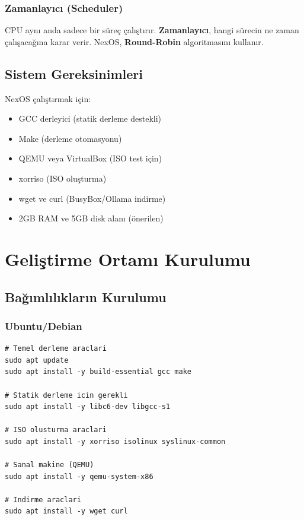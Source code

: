 \documentclass[12pt,a4paper]{report}
\begin{document}
\subsection{Zamanlayıcı (Scheduler)}

CPU aynı anda sadece bir süreç çalıştırır. \textbf{Zamanlayıcı}, hangi sürecin ne zaman çalışacağına karar verir. NexOS, \textbf{Round-Robin} algoritmasını kullanır.

\section{Sistem Gereksinimleri}

NexOS çalıştırmak için:
\begin{itemize}
    \item GCC derleyici (statik derleme destekli)
    \item Make (derleme otomasyonu)
    \item QEMU veya VirtualBox (ISO test için)
    \item xorriso (ISO oluşturma)
    \item wget ve curl (BusyBox/Ollama indirme)
    \item 2GB RAM ve 5GB disk alanı (önerilen)
\end{itemize}

\chapter{Geliştirme Ortamı Kurulumu}

\section{Bağımlılıkların Kurulumu}

\subsection{Ubuntu/Debian}

\begin{lstlisting}[style=bashstyle,caption={Gerekli Paketlerin Kurulumu}]
# Temel derleme araclari
sudo apt update
sudo apt install -y build-essential gcc make

# Statik derleme icin gerekli
sudo apt install -y libc6-dev libgcc-s1

# ISO olusturma araclari
sudo apt install -y xorriso isolinux syslinux-common

# Sanal makine (QEMU)
sudo apt install -y qemu-system-x86

# Indirme araclari
sudo apt install -y wget curl
\end{lstlisting}
\end{document}

